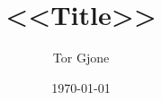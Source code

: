 \title[<<Shot Title>>]
		{<<Title>>}
\author{Tor Gjone}
\date{\today}






\begin{frame} \titlepage \end{frame}



\begin{frame}
\end{frame}



